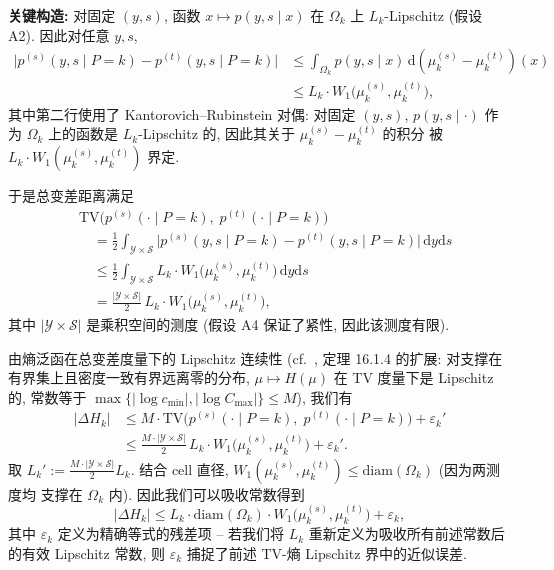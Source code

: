 \documentclass[12pt,a4paper]{article}
\newcommand{\cY}{\mathcal{Y}}
\newcommand{\cS}{\mathcal{S}}
\newcommand{\diam}{\mathrm{diam}}
\newcommand{\TV}{\mathrm{TV}}
\begin{document}
\textbf{关键构造:} 对固定 $(y,s)$, 函数 $x\mapsto p(y,s\mid x)$
在 $\Omega_k$ 上 $L_k$-Lipschitz (假设 A2). 因此对任意
$y,s$,
\begin{align*}
    \bigl|p^{(s)}(y,s\mid P=k) - p^{(t)}(y,s\mid P=k)\bigr|
    &\leq \int_{\Omega_k} p(y,s\mid x)\,
           \mathrm{d}(\mu^{(s)}_k-\mu^{(t)}_k)(x) \\
    &\leq L_k \cdot W_1\!\bigl(\mu^{(s)}_k,\mu^{(t)}_k\bigr),
\end{align*}
其中第二行使用了 Kantorovich--Rubinstein 对偶: 对固定
$(y,s)$, $p(y,s\mid\cdot)$ 作为 $\Omega_k$ 上的函数是
$L_k$-Lipschitz 的, 因此其关于 $\mu^{(s)}_k-\mu^{(t)}_k$ 的积分
被 $L_k\cdot W_1(\mu^{(s)}_k,\mu^{(t)}_k)$ 界定.

于是总变差距离满足
\begin{align*}
    &\TV\!\bigl(p^{(s)}(\cdot\mid P=k),\;p^{(t)}(\cdot\mid P=k)\bigr) \\
    &\quad = \frac12\int_{\cY\times\cS}
            \bigl|p^{(s)}(y,s\mid P=k)-p^{(t)}(y,s\mid P=k)\bigr|
            \,\mathrm{d}y\mathrm{d}s \\
    &\quad \leq \frac12\int_{\cY\times\cS}
            L_k\cdot W_1\!\bigl(\mu^{(s)}_k,\mu^{(t)}_k\bigr)
            \,\mathrm{d}y\mathrm{d}s \\
    &\quad = \frac{|\cY\times\cS|}{2}\,
            L_k\cdot W_1\!\bigl(\mu^{(s)}_k,\mu^{(t)}_k\bigr),
\end{align*}
其中 $|\cY\times\cS|$ 是乘积空间的测度 (假设 A4 保证了紧性,
因此该测度有限).

由熵泛函在总变差度量下的 Lipschitz 连续性 (cf.~\citet{cover1999elements},
定理 16.1.4 的扩展: 对支撑在有界集上且密度一致有界远离零的分布,
$\mu\mapsto H(\mu)$ 在 TV 度量下是 Lipschitz 的, 常数等于
$\max\{|\log c_{\min}|,|\log C_{\max}|\}\leq M$), 我们有
\begin{align*}
    |\Delta H_k|
    &\leq M\cdot \TV\!\bigl(p^{(s)}(\cdot\mid P=k),\;
                p^{(t)}(\cdot\mid P=k)\bigr) + \varepsilon_k' \\
    &\leq \frac{M\cdot|\cY\times\cS|}{2}\,
           L_k\cdot W_1\!\bigl(\mu^{(s)}_k,\mu^{(t)}_k\bigr)
           + \varepsilon_k'.
\end{align*}
取 $L_k' := \frac{M\cdot|\cY\times\cS|}{2}L_k$. 结合 cell 直径,
$W_1(\mu^{(s)}_k,\mu^{(t)}_k)\leq\diam(\Omega_k)$ (因为两测度均
支撑在 $\Omega_k$ 内). 因此我们可以吸收常数得到
\begin{equation}\label{eq:step3b}
    |\Delta H_k| \leq L_k\cdot\diam(\Omega_k)\cdot
    W_1\!\bigl(\mu^{(s)}_k,\mu^{(t)}_k\bigr) + \varepsilon_k,
\end{equation}
其中 $\varepsilon_k$ 定义为精确等式的残差项 -- 若我们将
$L_k$ 重新定义为吸收所有前述常数后的有效 Lipschitz 常数,
则 $\varepsilon_k$ 捕捉了前述 TV-熵 Lipschitz 界中的近似误差.
\checkmark
\end{document}
